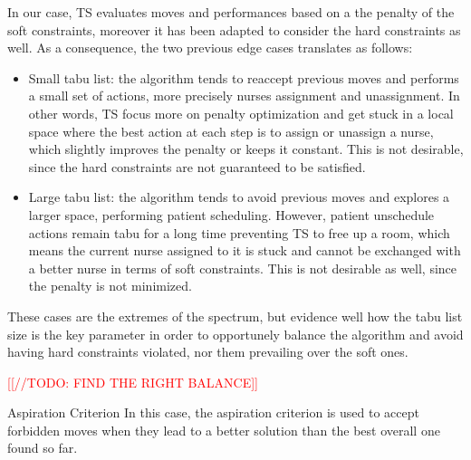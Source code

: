 \begin{section}
\begin{subsection}
     In our case, TS evaluates moves and performances based on a
     the penalty of the soft constraints, moreover it has been adapted to consider
     the hard constraints as well. As a consequence,
     the two previous edge cases translates as follows:
     \begin{itemize}
         \item Small tabu list: the algorithm tends to reaccept previous moves and
               performs a small set of actions, more precisely nurses assignment and unassignment.
               In other words, TS focus more on penalty optimization and get stuck in a local space where
               the best action at each step is to assign or unassign a nurse, which slightly improves the penalty
               or keeps it constant. This is not desirable, since the hard constraints are not guaranteed to be satisfied.
         \item Large tabu list: the algorithm tends to avoid previous moves and explores a larger space,
               performing patient scheduling. However, patient unschedule
               actions remain tabu for a long time preventing TS to free up a room, which means
               the current nurse assigned to it is stuck and cannot be exchanged with a
               better nurse in terms of soft constraints.
               This is not desirable as well, since the penalty is not minimized.

     \end{itemize}
     These cases are the extremes of the spectrum,
     but evidence well how the tabu list size is the key parameter in order to
     opportunely balance the algorithm and avoid having
     hard constraints violated, nor them prevailing over the soft ones.

     \textcolor{red}{[[//TODO: FIND THE RIGHT BALANCE]]}

 \end{subsection}

 \begin{subsection}
     {Aspiration Criterion}
     In this case, the aspiration criterion is used to accept forbidden moves when they lead to
     a better solution than the best overall one found so far.


 \end{subsection}
\end{section}